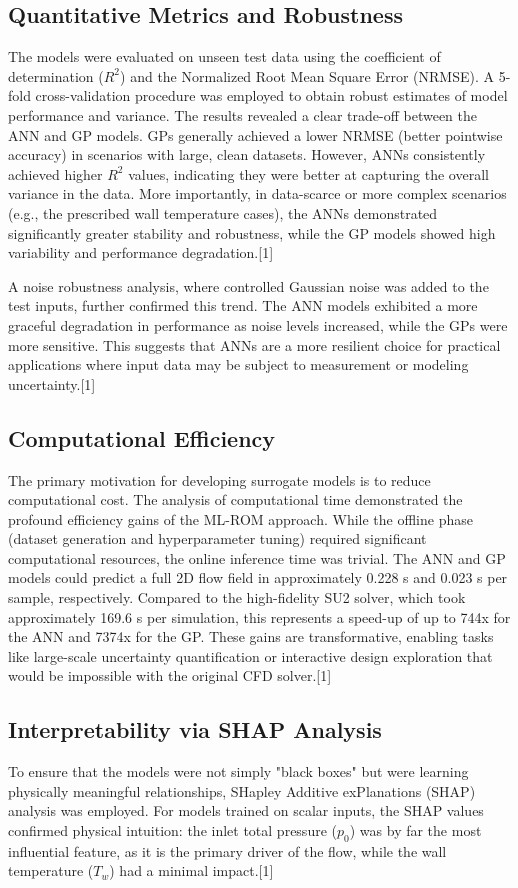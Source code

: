 \documentclass[12pt, a4paper]{report}
\begin{document}
\subsection{Quantitative Metrics and Robustness}
The models were evaluated on unseen test data using the coefficient of determination ($R^2$) and the Normalized Root Mean Square Error (NRMSE). A 5-fold cross-validation procedure was employed to obtain robust estimates of model performance and variance. The results revealed a clear trade-off between the ANN and GP models. GPs generally achieved a lower NRMSE (better pointwise accuracy) in scenarios with large, clean datasets. However, ANNs consistently achieved higher $R^2$ values, indicating they were better at capturing the overall variance in the data. More importantly, in data-scarce or more complex scenarios (e.g., the prescribed wall temperature cases), the ANNs demonstrated significantly greater stability and robustness, while the GP models showed high variability and performance degradation.[1]

A noise robustness analysis, where controlled Gaussian noise was added to the test inputs, further confirmed this trend. The ANN models exhibited a more graceful degradation in performance as noise levels increased, while the GPs were more sensitive. This suggests that ANNs are a more resilient choice for practical applications where input data may be subject to measurement or modeling uncertainty.[1]

\subsection{Computational Efficiency}
The primary motivation for developing surrogate models is to reduce computational cost. The analysis of computational time demonstrated the profound efficiency gains of the ML-ROM approach. While the offline phase (dataset generation and hyperparameter tuning) required significant computational resources, the online inference time was trivial. The ANN and GP models could predict a full 2D flow field in approximately 0.228 s and 0.023 s per sample, respectively. Compared to the high-fidelity SU2 solver, which took approximately 169.6 s per simulation, this represents a speed-up of up to 744x for the ANN and 7374x for the GP. These gains are transformative, enabling tasks like large-scale uncertainty quantification or interactive design exploration that would be impossible with the original CFD solver.[1]

\subsection{Interpretability via SHAP Analysis}
To ensure that the models were not simply "black boxes" but were learning physically meaningful relationships, SHapley Additive exPlanations (SHAP) analysis was employed. For models trained on scalar inputs, the SHAP values confirmed physical intuition: the inlet total pressure ($p_0$) was by far the most influential feature, as it is the primary driver of the flow, while the wall temperature ($T_w$) had a minimal impact.[1]
\end{document}
